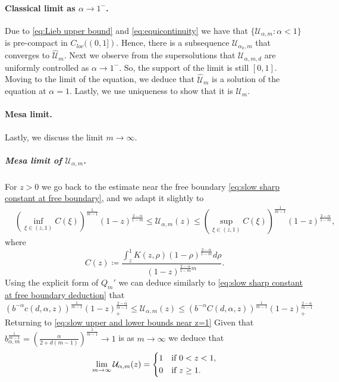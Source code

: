 \documentclass[a4paper]{article}
\theoremstyle{definition}
\begin{document}
\paragraph{Classical limit as $\alpha \to 1^-$.}
Due to \eqref{eq:Lieb upper bound} and \eqref{eq:equicontinuity} we have that $\{\mathcal U_{\alpha,m} : \alpha < 1 \}$ is pre-compact in $C_{loc}((0,1])$.
Hence, there is a subsequence $\mathcal U_{\alpha_k,m}$ that converges to $\widehat{\mathcal U}_m$. Next we observe from the supersolutions that $\mathcal U_{\alpha,m,d}$ are uniformly controlled as $\alpha \to 1^-$. So, the support of the limit is still $[0,1]$. Moving to the limit of the equation, we deduce that $\widehat{\mathcal U}_m$ is a solution of the equation at $\alpha = 1$. Lastly, we use uniqueness to show that it is $\mathcal U_{m}$.

%
%
%
%
%
%
%
%

%
\paragraph{Mesa limit.} Lastly, we discuss the limit $m \to \infty$.

%
%
%
%
%
%
%
%
%
%
%
%
%
%

\subparagraph{Mesa limit of $\mathcal U_{\alpha,m}$.}
For $z > 0$ we go back to the estimate near the free boundary \eqref{eq:slow sharp constant at free boundary}, and we adapt it slightly to
\begin{align*}
& \left(\inf_{\xi \in (z,1)} C(\xi)\right)^{\frac 1 {m-1}} (1-z)^{\frac{2-\alpha}{1-m}}
\le \mathcal U_{\alpha,m}(z)
\le \left(\sup_{\xi \in (z,1)} C(\xi)\right)^{\frac 1 {m-1}} (1-z)^{\frac{2-\alpha}{1-m}},
\end{align*}
where
\[
C(z) \coloneqq \frac{\int_z^1 K(z, \rho) (1-\rho)^{\frac{2-\alpha}{1-m}} d\rho}{(1-z)^{\frac{2-\alpha}{1-m}m}}.
\]
Using the explicit form of $Q_m'$ we can deduce similarly to \eqref{eq:slow sharp constant at free boundary deduction} that
\begin{equation}
\label{eq:slow upper and lower bounds near z=1}
(b^{-\alpha} c(d,\alpha,z))^{\frac{1}{m-1}} (1-z)_+^{\frac{2-\alpha}{m-1}} \le \mathcal U_{\alpha,m}(z) \le (b^{-\alpha} C(d,\alpha,z))^{\frac{1}{m-1}} (1-z)_+^{\frac{2-\alpha}{m-1}}
\end{equation}
Returning to \eqref{eq:slow upper and lower bounds near z=1}
Given that $b_{\alpha,m}^{\frac 1 {m-1}} = \left(\frac{\alpha}{2+d(m-1)}\right)^{\frac 1{m-1}} \to 1$ is as $m \to \infty$ we deduce that
\begin{equation*}
\lim_{m\to \infty} \mathcal U_{\alpha,m} (z) =
\begin{dcases}
  1 & \text{if } 0 < z < 1, \\
  0 & \text{if } z \ge 1.
\end{dcases}
\end{equation*}
\end{document}
